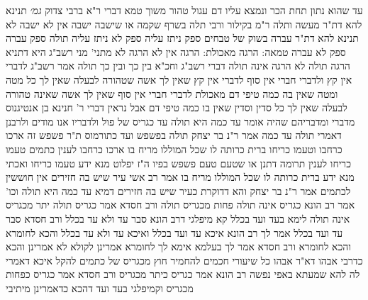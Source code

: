 \documentclass[12pt, openany]{book}
\begin{document}
{עד שהוא נתון תחת הכר ונמצא עליו דם עגול טהור משוך טמא דברי ר"א ברבי צדוק
{\large\emph{גמ׳}} תנינא להא דת"ר מעשה ותלה ר"מ בקילור ורבי תלה בשרף שקמה
או שישבה ישבה אין לא ישבה לא 
תנינא להא דת"ר עברה בשוק של טבחים ספק ניתז עליה ספק לא ניתז עליה תולה ספק עברה ספק לא עברה טמאה:
הרגה מאכולת: הרגה אין לא הרגה לא מתני' מני רשב"ג היא דתניא הרגה תולה לא הרגה אינה תולה דברי רשב"ג וחכ"א בין כך ובין כך תולה 
אמר רשב"ג לדברי אין קץ ולדברי חברי אין סוף 
לדברי אין קץ שאין לך אשה שטהורה לבעלה שאין לך כל מטה ומטה שאין בה כמה טיפי דם מאכולת 
לדברי חברי אין סוף שאין לך אשה שאינה טהורה לבעלה שאין לך כל סדין וסדין שאין בו כמה טיפי דם 
אבל נראין דברי ר' חנינא בן אנטיגנוס מדברי ומדבריהם שהיה אומר עד כמה היא תולה עד כגריס של פול ולדבריו אנו מודים ולרבנן דאמרי תולה עד כמה אמר ר"נ בר יצחק תולה בפשפש ועד כתורמוס 
ת"ר פשפש זה ארכו כרחבו וטעמו כריחו ברית כרותה לו שכל המוללו מריח בו ארכו כרחבו לענין כתמים
טעמו כריחו לענין תרומה דתנן או שטעם טעם פשפש בפיו ה"ז יפלוט מנא ידע טעמו כריחו ואכתי מנא ידע ברית כרותה לו שכל המוללו מריח בו 
אמר רב אשי עיר שיש בה חזירים אין חוששין לכתמים אמר ר"נ בר יצחק והא דדוקרת כעיר שיש בה חזירים דמיא
עד כמה היא תולה וכו' אמר רב הונא כגריס אינה תולה פחות מכגריס תולה ורב חסדא אמר כגריס תולה יתר מכגריס אינה תולה 
לימא בעד ועד בכלל קא מיפלגי דרב הונא סבר עד ולא עד בכלל ורב חסדא סבר עד ועד בכלל 
אמר לך רב הונא איכא עד ועד בכלל ואיכא עד ולא עד בכלל והכא לחומרא והכא לחומרא 
ורב חסדא אמר לך בעלמא אימא לך לחומרא אמרינן לקולא לא אמרינן והכא כדרבי אבהו דא"ר אבהו כל שיעורי חכמים להחמיר חוץ מכגריס של כתמים להקל 
איכא דאמרי לה להא שמעתא באפי נפשה רב הונא אמר כגריס כיתר מכגריס ורב חסדא אמר כגריס כפחות מכגריס וקמיפלגי בעד ועד דהכא כדאמרינן מיתיבי}
\end{document}
